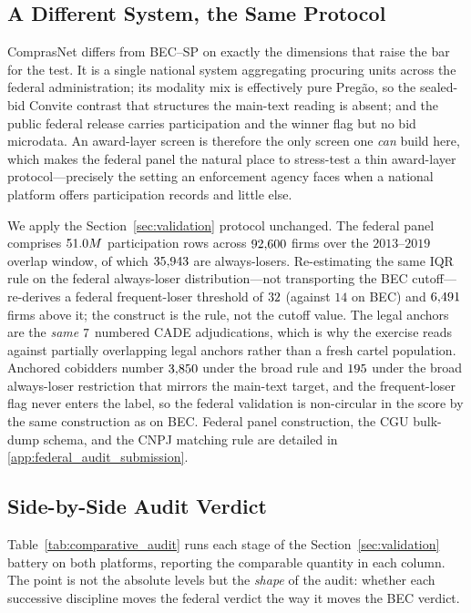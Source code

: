 \subsection{A Different System, the Same Protocol}
\label{sec:comparative_setting}

ComprasNet differs from BEC--SP on exactly the dimensions that raise
the bar for the test. It is a single national system aggregating
procuring units across the federal administration; its modality mix is
effectively pure Preg\~ao, so the sealed-bid Convite contrast that
structures the main-text reading is absent; and the public federal
release carries participation and the winner flag but no bid microdata.
An award-layer screen is therefore the only screen one \emph{can} build
here, which makes the federal panel the natural place to stress-test a
thin award-layer protocol---precisely the setting an enforcement agency
faces when a national platform offers participation records and little
else.

We apply the Section~\ref{sec:validation} protocol unchanged. The
federal panel comprises $51.0M$ participation rows across
$92{,}600$ firms over the $2013$--$2019$ overlap window, of which
$35{,}943$ are always-losers. Re-estimating the same IQR
rule on the federal always-loser distribution---not transporting the
BEC cutoff---re-derives a federal frequent-loser threshold of
$32$ (against $14$ on BEC) and $6{,}491$ firms
above it; the construct is the rule, not the cutoff value. The legal
anchors are the \emph{same} $7$ numbered CADE
adjudications, which is why the exercise reads against partially
overlapping legal anchors rather than a fresh cartel population.
Anchored cobidders number $3{,}850$ under the broad rule
and $195$ under the broad always-loser
restriction that mirrors the main-text target, and the frequent-loser
flag never enters the label, so the federal validation is non-circular
in the score by the same construction as on BEC. Federal panel
construction, the CGU bulk-dump schema, and the CNPJ matching rule are
detailed in \ref{app:federal_audit_submission}.

\subsection{Side-by-Side Audit Verdict}
\label{sec:comparative_verdict}

Table~\ref{tab:comparative_audit} runs each stage of the
Section~\ref{sec:validation} battery on both platforms, reporting the
comparable quantity in each column. The point is not the absolute
levels but the \emph{shape} of the audit: whether each successive
discipline moves the federal verdict the way it moves the BEC verdict.

